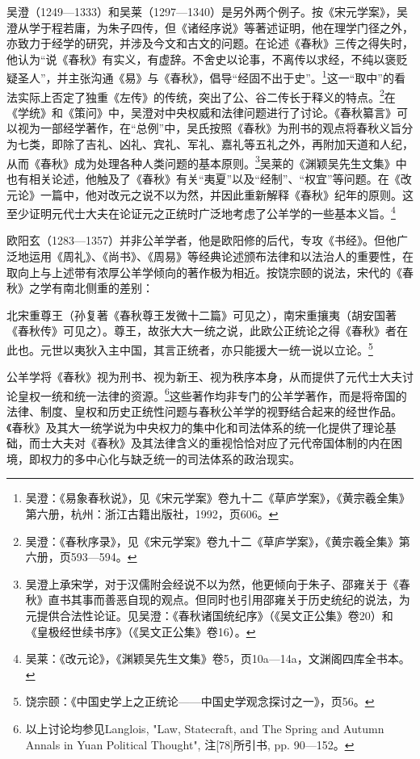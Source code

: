 \documentclass[a4paper, 12pt, openright]{ctexbook}
\renewenvironment{quote}
  {\list{}{\rightmargin2\ccwd \leftmargin2\ccwd \itemindent=2\ccwd \listparindent=2\ccwd}%
   \item\relax\small\kaishu\color{black}}
  {\endlist}
\begin{document}
吴澄（1249—1333）和吴莱（1297—1340）是另外两个例子。按《宋元学案》，吴澄从学于程若庸，为朱子四传，但《诸经序说》等著述证明，他在理学门径之外，亦致力于经学的研究，并涉及今文和古文的问题。在论述《春秋》三传之得失时，他认为“说《春秋》有实义，有虚辞。不舍史以论事，不离传以求经，不纯以褒贬疑圣人”，并主张沟通《易》与《春秋》，倡导“经固不出于史”。\footnote{吴澄：《易象春秋说》，见《宋元学案》卷九十二《草庐学案》，《黄宗羲全集》第六册，杭州：浙江古籍出版社，1992，页606。}这一“取中”的看法实际上否定了独重《左传》的传统，突出了公、谷二传长于释义的特点。\footnote{吴澄：《春秋序录》，见《宋元学案》卷九十二《草庐学案》，《黄宗羲全集》第六册，页593—594。}在《学统》和《策问》中，吴澄对中央权威和法律问题进行了讨论。《春秋纂言》可以视为一部经学著作，在“总例”中，吴氏按照《春秋》为刑书的观点将春秋义旨分为七类，即除了吉礼、凶礼、宾礼、军礼、嘉礼等五礼之外，再附加天道和人纪，从而《春秋》成为处理各种人类问题的基本原则。\footnote{吴澄上承宋学，对于汉儒附会经说不以为然，他更倾向于朱子、邵雍关于《春秋》直书其事而善恶自现的观点。但同时也引用邵雍关于历史统纪的说法，为元提供合法性论证。见吴澄：《春秋诸国统纪序》（《吴文正公集》卷20）和《皇极经世续书序》（《吴文正公集》卷16）。}吴莱的《渊颖吴先生文集》中也有相关论述，他触及了《春秋》有关“夷夏”以及“经制”、“权宜”等问题。在《改元论》一篇中，他对改元之说不以为然，并因此重新解释《春秋》纪年的原则。这至少证明元代士大夫在论证元之正统时广泛地考虑了公羊学的一些基本义旨。\footnote{吴莱：《改元论》，《渊颖吴先生文集》卷5，页10a—14a，文渊阁四库全书本。}

欧阳玄（1283—1357）并非公羊学者，他是欧阳修的后代，专攻《书经》。但他广泛地运用《周礼》、《尚书》、《周易》等经典论述颁布法律和以法治人的重要性，在取向上与上述带有浓厚公羊学倾向的著作极为相近。按饶宗颐的说法，宋代的《春秋》之学有南北侧重的差别：

\begin{quote}
北宋重尊王（孙复著《春秋尊王发微十二篇》可见之），南宋重攘夷（胡安国著《春秋传》可见之）。尊王，故张大大一统之说，此欧公正统论之得《春秋》者在此也。元世以夷狄入主中国，其言正统者，亦只能援大一统一说以立论。\footnote{饶宗颐：《中国史学上之正统论——中国史学观念探讨之一》，页56。}
\end{quote}

公羊学将《春秋》视为刑书、视为新王、视为秩序本身，从而提供了元代士大夫讨论皇权一统和统一法律的资源。\footnote{以上讨论均参见Langlois, "Law, Statecraft, and The Spring and Autumn Annals in Yuan Political Thought", 注[78]所引书, pp. 90—152。}这些著作均非专门的公羊学著作，而是将帝国的法律、制度、皇权和历史正统性问题与春秋公羊学的视野结合起来的经世作品。《春秋》及其大一统学说为中央权力的集中化和司法体系的统一化提供了理论基础，而士大夫对《春秋》及其法律含义的重视恰恰对应了元代帝国体制的内在困境，即权力的多中心化与缺乏统一的司法体系的政治现实。
\end{document}
